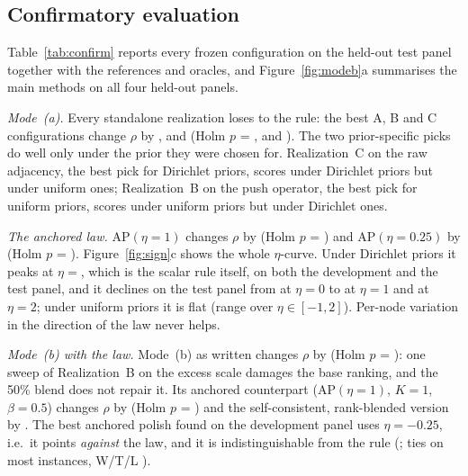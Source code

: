 \documentclass[11pt,a4paper]{article}
\theoremstyle{definition}
\theoremstyle{plain}
\newcommand{\AP}{\mathrm{AP}}
\begin{document}
\TabHeadroom

\subsection{Confirmatory evaluation}\label{sec:confirm}

Table~\ref{tab:confirm} reports every frozen configuration on the held-out test panel together with the references and oracles, and Figure~\ref{fig:modeb}a summarises the main methods on all four held-out panels.

\emph{Mode~(a).} Every standalone realization loses to the rule: the best A, B and C configurations change $\rho$ by \TestAbestD, \TestBbestD{} and \TestCbestD{} (Holm $p$ = \TestAbestHolm, \TestBbestHolm{} and \TestCbestHolm). The two prior-specific picks do well only under the prior they were chosen for. Realization~C on the raw adjacency, the best pick for Dirichlet priors, scores \TestCdirOnDir{} under Dirichlet priors but \TestCdirOnUnif{} under uniform ones; Realization~B on the push operator, the best pick for uniform priors, scores \TestBunifOnUnif{} under uniform priors but \TestBunifOnDir{} under Dirichlet ones.

\emph{The anchored law.} $\AP(\eta=1)$ changes $\rho$ by \TestAPoneD{} \TestAPoneCI{} (Holm $p$ = \TestAPoneHolm) and $\AP(\eta=0.25)$ by \TestAPquarterD{} (Holm $p$ = \TestAPquarterHolm). Figure~\ref{fig:sign}c shows the whole $\eta$-curve. Under Dirichlet priors it peaks at $\eta={}$\EtaBestDir{}, which is the scalar rule itself, on both the development and the test panel, and it declines on the test panel from \EtaZeroTestDir{} at $\eta=0$ to \EtaOneTestDir{} at $\eta=1$ and \EtaTwoTestDir{} at $\eta=2$; under uniform priors it is flat (range \EtaUnifRange{} over $\eta\in[-1,2]$). Per-node variation in the direction of the law never helps.

\emph{Mode~(b) with the law.} Mode~(b) as written changes $\rho$ by \TestPBXnomBD{} (Holm $p$ = \TestPBXnomBHolm): one sweep of Realization~B on the excess scale damages the base ranking, and the 50\% blend does not repair it. Its anchored counterpart ($\AP(\eta=1)$, $K=1$, $\beta=0.5$) changes $\rho$ by \TestPBnomD{} (Holm $p$ = \TestPBnomHolm) and the self-consistent, rank-blended version by \TestPBoneD. The best anchored polish found on the development panel uses $\eta=-0.25$, i.e.\ it points \emph{against} the law, and it is indistinguishable from the rule (\TestPBbestDfour; ties on most instances, W/T/L \TestPBbestWTL).
\end{document}
